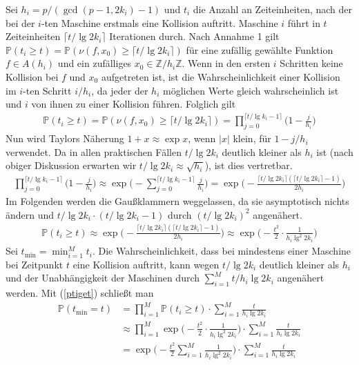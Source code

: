 \documentclass[a4paper, 10pt, ngerman]{article}
\newcommand{\Z}{\mathbb{Z}}
\renewcommand{\P}{\mathbb{P}}
\begin{document}
Sei $h_i = p/(\gcd(p - 1, 2k_i) - 1)$ und $t_i$ die Anzahl an Zeiteinheiten, nach der bei der $i$-ten Maschine erstmals eine Kollision auftritt. Maschine $i$ führt in $t$ Zeiteinheiten $\lceil t / \lg 2k_i \rceil$ Iterationen durch. Nach Annahme 1 gilt $\P(t_i \ge t) = \P(\nu(f, x_0) \ge \lceil t / \lg 2k_i \rceil)$ für eine zufällig gewählte Funktion $f \in A(h_i)$ und ein zufälliges $x_0 \in \Z/h_i\Z$. Wenn in den ersten $i$ Schritten keine Kollision bei $f$ und $x_0$ aufgetreten ist, ist die Wahrscheinlichkeit einer Kollision im $i$-ten Schritt $i/h_i$, da jeder der $h_i$ möglichen Werte gleich wahrscheinlich ist und $i$ von ihnen zu einer Kollision führen. Folglich gilt
\begin{align*}
    \P(t_i \ge t) = \P(\nu(f, x_0) \ge \lceil t / \lg 2k_i \rceil) = \prod_{j = 0}^{\lceil t / \lg k_i - 1 \rceil} \bigg (1 - \frac {j} {h_i} \bigg )
\end{align*}
Nun wird Taylors Näherung $1 + x \approx \exp x$, wenn $|x|$ klein, für $1 - j/h_i$ verwendet. Da in allen praktischen Fällen $t/\lg 2k_i$ deutlich kleiner als $h_i$ ist (nach obiger Diskussion erwarten wir $t/\lg 2k_i \approx \sqrt{h_i}$), ist dies vertretbar.
\begin{align*}
    \prod_{j = 0}^{\lceil t / \lg k_i - 1 \rceil} \bigg (1 - \frac {j} {h_i} \bigg )
    \approx \exp \Bigg (-\sum_{j = 0}^{\lceil t / \lg k_i - 1 \rceil} \frac j {h_i} \Bigg )
    = \exp \Bigg (- \frac {\lceil t / \lg 2k_i \rceil (\lceil t / \lg 2k_i \rceil - 1)} {2h_i} \Bigg )
\end{align*}
Im Folgenden werden die Gaußklammern weggelassen, da sie asymptotisch nichts ändern und $t/\lg2k_i \cdot (t/\lg2k_i - 1)$ durch $(t/\lg2k_i)^2$ angenähert.
\begin{align}
    \P(t_i \ge t)
    \approx \exp \Bigg (- \frac {\lceil t / \lg 2k_i \rceil (\lceil t / \lg 2k_i \rceil - 1)} {2h_i} \Bigg )
    \approx \exp \Bigg ( - \frac {t^2} 2 \cdot \frac 1{h_i \lg^2 2k_i} \Bigg ) \label{ptiget}
\end{align}
Sei $t_{\min} = \min_{i = 1}^M t_i$. Die Wahrscheinlichkeit, dass bei mindestens einer Maschine bei Zeitpunkt $t$ eine Kollision auftritt, kann wegen $t / \lg 2k_i$ deutlich kleiner als $h_i$ und der Unabhängigkeit der Maschinen durch $\sum_{i = 1}^M t/h_i\lg2k_i$ angenähert werden. Mit (\ref{ptiget}) schließt man
\begin{align*}
    \P(t_{\min} = t)
     & = \prod_{i = 1}^M \P(t_i \ge t) \cdot \sum_{i = 1}^M \frac {t} {h_i\lg2k_i}                                                            \\
     & \approx \prod_{i = 1}^M \exp \Bigg ( - \frac {t^2} 2 \cdot \frac 1{h_i \lg^2 2k_i} \Bigg ) \cdot \sum_{i = 1}^M \frac {t} {h_i\lg2k_i} \\
     & = \exp \Bigg ( - \frac {t^2} 2 \sum_{i = 1}^M \frac 1{h_i \lg^2 2k_i} \Bigg ) \cdot \sum_{i = 1}^M \frac {t} {h_i\lg2k_i}              \\
\end{align*}
\end{document}
